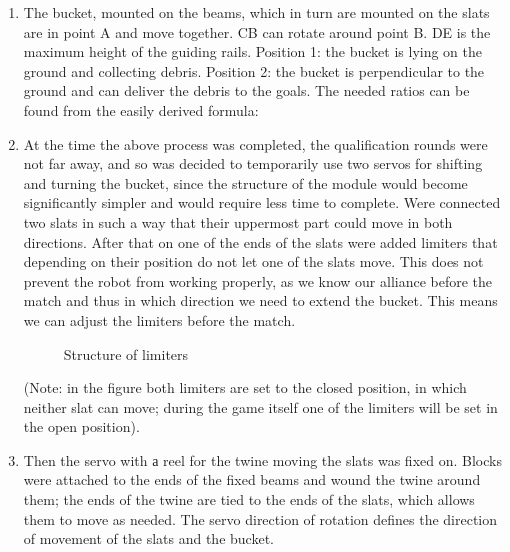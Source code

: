 \begin{enumerate}
  \item The bucket, mounted on the beams, which in turn are mounted on the slats are in point A and move together. CB can rotate around point B. DE is the maximum height of the guiding rails. Position 1: the bucket is lying on the ground and collecting debris. Position 2: the bucket is perpendicular to the ground and can deliver the debris to the goals. The needed ratios can be found from the easily derived formula: %
  \item At the time the above process was completed, the qualification rounds were not far away, and so was decided to temporarily use two servos for shifting and turning the bucket, since the structure of the module would become significantly simpler and would require less time to complete. Were connected two slats in such a way that their uppermost part could move in both directions. After that on one of the ends of the slats were added limiters that depending on their position do not let one of the slats move. This does not prevent the robot from working properly, as we know our alliance before the match and thus in which direction we need to extend the bucket. This means we can adjust the limiters before the match.
    \begin{figure}[h]
  	  \begin{minipage}[h]{1\linewidth}
  		  \caption{Structure of limiters}
    	\end{minipage}
    \end{figure}
  (Note: in the figure both limiters are set to the closed position, in which neither slat can move; during the game itself one of the limiters will be set in the open position). 
  \item Then the servo with а reel for the twine moving the slats was fixed on. Blocks were attached to the ends of the fixed beams and wound the twine around them; the ends of the twine are tied to the ends of the slats, which allows them to move as needed. The servo direction of rotation defines the direction of movement of the slats and the bucket. 	
  

\end{enumerate}
